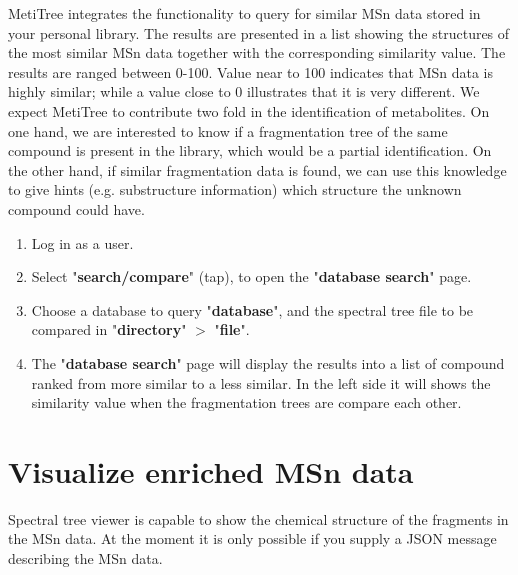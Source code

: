 \documentclass[12pt]{report}
\begin{document}
MetiTree integrates the functionality to query for similar MSn data stored in your personal library. The results are presented in a list showing the structures of the most similar MSn data together with the corresponding similarity value. The results are ranged between 0-100. Value near to 100 indicates that MSn data is highly similar; while a value close to 0 illustrates that it is very different. We expect MetiTree to contribute two fold in the identification of metabolites. On one hand, we are interested to know if a fragmentation tree of the same compound is present in the library, which would be a partial identification. On the other hand, if similar fragmentation data is found, we can use this knowledge to give hints (e.g. substructure information) which structure the unknown compound could have. 

\begin{enumerate}
\item Log in as a user.
\item Select "\textbf{search/compare}" (tap), to open the
"\textbf{database search}" page.
\item Choose a database to query "\textbf{database}", and the
spectral tree file to be compared in "\textbf{directory}" $>$
"\textbf{file}".

\begin{center}
\begin{figure}[H]
\end{figure}
\end{center}

\item The "\textbf{database search}" page will display the results
into a list of compound ranked from more similar to a less similar. In the left side it will shows the similarity value when the fragmentation trees are compare each other.

\begin{center}
\begin{figure}[H]
\end{figure}
\end{center}

\end{enumerate}

\newpage
\section{Visualize enriched MSn data}
Spectral tree viewer is capable to show the chemical structure of the fragments in the MSn data. At the moment it is only possible if you supply a JSON message describing the MSn data.
\end{document}
